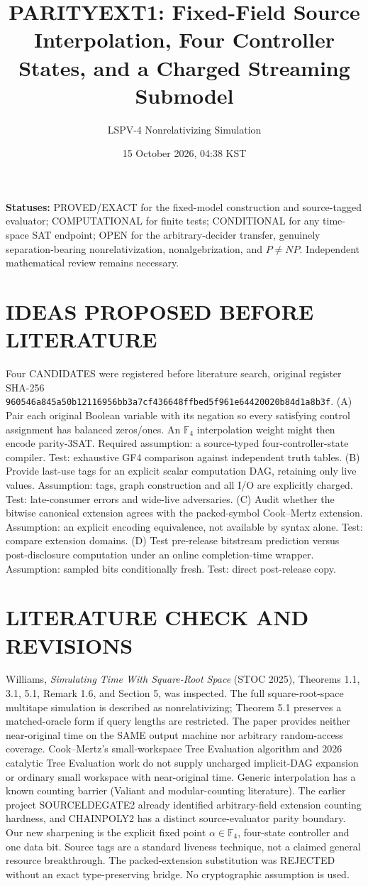 \documentclass[11pt]{article}
\title{PARITYEXT1: Fixed-Field Source Interpolation, Four Controller States, and a Charged Streaming Submodel}
\author{LSPV-4 Nonrelativizing Simulation}
\date{15 October 2026, 04:38 KST}
\begin{document}
\maketitle
\noindent\textbf{Statuses:} PROVED/EXACT for the fixed-model construction and source-tagged evaluator; COMPUTATIONAL for finite tests; CONDITIONAL for any time-space SAT endpoint; OPEN for the arbitrary-decider transfer, genuinely separation-bearing nonrelativization, nonalgebrization, and $P\ne NP$. Independent mathematical review remains necessary.
\section{IDEAS PROPOSED BEFORE LITERATURE}
Four CANDIDATES were registered before literature search, original register SHA-256
\texttt{960546a845a50b12116956bb3a7cf436648ffbed5f961e64420020b84d1a8b3f}.
(A) Pair each original Boolean variable with its negation so every satisfying control assignment has balanced zeros/ones. An $\mathbb F_4$ interpolation weight might then encode parity-3SAT. Required assumption: a source-typed four-controller-state compiler. Test: exhaustive GF4 comparison against independent truth tables.
(B) Provide last-use tags for an explicit scalar computation DAG, retaining only live values. Assumption: tags, graph construction and all I/O are explicitly charged. Test: late-consumer errors and wide-live adversaries.
(C) Audit whether the bitwise canonical extension agrees with the packed-symbol Cook--Mertz extension. Assumption: an explicit encoding equivalence, not available by syntax alone. Test: compare extension domains.
(D) Test pre-release bitstream prediction versus post-disclosure computation under an online completion-time wrapper. Assumption: sampled bits conditionally fresh. Test: direct post-release copy.
\section{LITERATURE CHECK AND REVISIONS}
Williams, \emph{Simulating Time With Square-Root Space} (STOC 2025), Theorems 1.1, 3.1, 5.1, Remark 1.6, and Section 5, was inspected. The full square-root-space multitape simulation is described as nonrelativizing; Theorem 5.1 preserves a matched-oracle form if query lengths are restricted. The paper provides neither near-original time on the SAME output machine nor arbitrary random-access coverage. Cook--Mertz's small-workspace Tree Evaluation algorithm and 2026 catalytic Tree Evaluation work do not supply uncharged implicit-DAG expansion or ordinary small workspace with near-original time. Generic interpolation has a known counting barrier (Valiant and modular-counting literature). The earlier project SOURCELDEGATE2 already identified arbitrary-field extension counting hardness, and CHAINPOLY2 has a distinct source-evaluator parity boundary. Our new sharpening is the explicit fixed point $\alpha\in\mathbb F_4$, four-state controller and one data bit. Source tags are a standard liveness technique, not a claimed general resource breakthrough. The packed-extension substitution was REJECTED without an exact type-preserving bridge. No cryptographic assumption is used.
\end{document}
